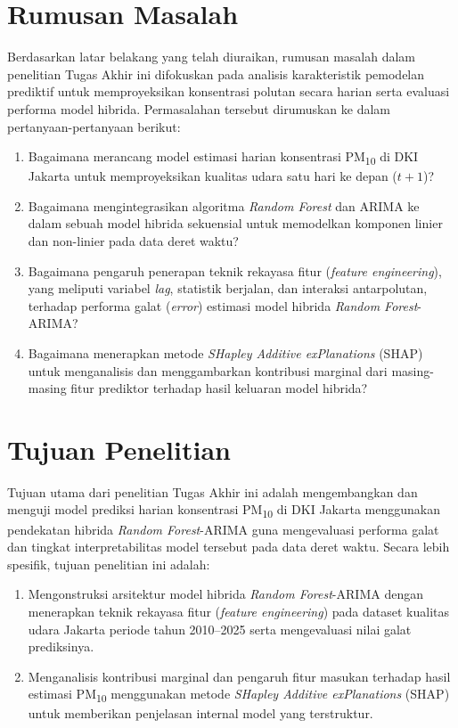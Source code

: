 \section{Rumusan Masalah}
Berdasarkan latar belakang yang telah diuraikan, rumusan masalah dalam penelitian Tugas Akhir ini difokuskan pada analisis karakteristik pemodelan prediktif untuk memproyeksikan konsentrasi polutan secara harian serta evaluasi performa model hibrida. Permasalahan tersebut dirumuskan ke dalam pertanyaan-pertanyaan berikut:

\begin{enumerate}
   \item Bagaimana merancang model estimasi harian konsentrasi PM\textsubscript{10} di DKI Jakarta untuk memproyeksikan kualitas udara satu hari ke depan ($t+1$)?
   \item Bagaimana mengintegrasikan algoritma \textit{Random Forest} dan ARIMA ke dalam sebuah model hibrida sekuensial untuk memodelkan komponen linier dan non-linier pada data deret waktu?
   \item Bagaimana pengaruh penerapan teknik rekayasa fitur (\textit{feature engineering}), yang meliputi variabel \textit{lag}, statistik berjalan, dan interaksi antarpolutan, terhadap performa galat (\textit{error}) estimasi model hibrida \textit{Random Forest}-ARIMA?
   \item Bagaimana menerapkan metode \textit{SHapley Additive exPlanations} (SHAP) untuk menganalisis dan menggambarkan kontribusi marginal dari masing-masing fitur prediktor terhadap hasil keluaran model hibrida?
\end{enumerate}

\section{Tujuan Penelitian}

Tujuan utama dari penelitian Tugas Akhir ini adalah mengembangkan dan menguji model prediksi harian konsentrasi PM\textsubscript{10} di DKI Jakarta menggunakan pendekatan hibrida \textit{Random Forest}-ARIMA guna mengevaluasi performa galat dan tingkat interpretabilitas model tersebut pada data deret waktu. Secara lebih spesifik, tujuan penelitian ini adalah:
\begin{enumerate}
   \item Mengonstruksi arsitektur model hibrida \textit{Random Forest}-ARIMA dengan menerapkan teknik rekayasa fitur (\textit{feature engineering}) pada dataset kualitas udara Jakarta periode tahun 2010--2025 serta mengevaluasi nilai galat prediksinya.
   \item Menganalisis kontribusi marginal dan pengaruh fitur masukan terhadap hasil estimasi PM\textsubscript{10} menggunakan metode \textit{SHapley Additive exPlanations} (SHAP) untuk memberikan penjelasan internal model yang terstruktur.
\end{enumerate}

